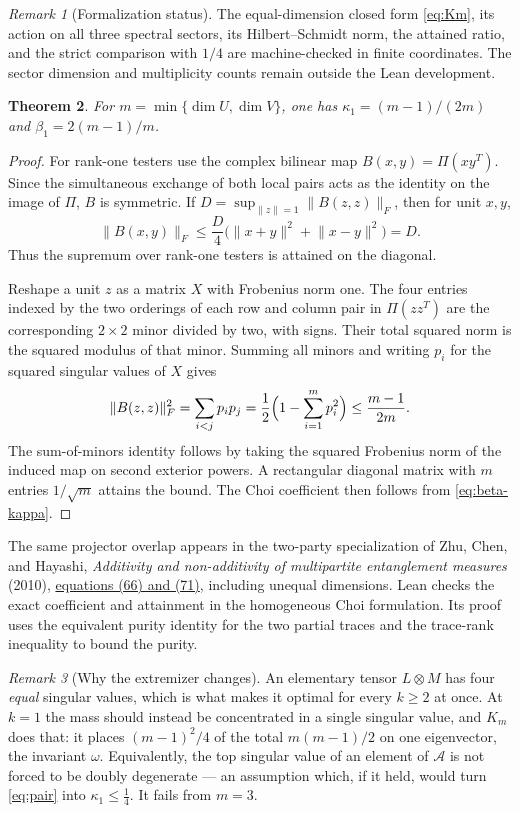 \documentclass[11pt,reqno]{amsart}
\theoremstyle{plain}
\newtheorem{theorem}{Theorem}[section]
\theoremstyle{remark}
\newtheorem{remark}[theorem]{Remark}
\newcommand{\norm}[1]{\lVert #1\rVert}
\begin{document}
\begin{remark}[Formalization status]
The equal-dimension closed form \eqref{eq:Km}, its action on all three spectral
sectors, its Hilbert--Schmidt norm, the attained ratio, and the strict
comparison with $1/4$ are machine-checked in finite coordinates. The sector
dimension and multiplicity counts remain outside the Lean development.
\end{remark}

\begin{theorem}
\label{thm:k1-exact}
For $m=\min\{\dim U,\dim V\}$, one has
$\kappa_1=(m-1)/(2m)$ and $\beta_1=2(m-1)/m$.
\end{theorem}
\begin{proof}
For rank-one testers use the complex bilinear map
$B(x,y)=\Pi(xy^T)$. Since the simultaneous exchange of both local pairs acts
as the identity on the image of $\Pi$, $B$ is symmetric. If
$D=\sup_{\norm z=1}\norm{B(z,z)}_F$, then for unit $x,y$,
\[
  \norm{B(x,y)}_F
  \le \frac{D}{4}\bigl(\norm{x+y}^2+\norm{x-y}^2\bigr)=D.
\]
Thus the supremum over rank-one testers is attained on the diagonal.

Reshape a unit $z$ as a matrix $X$ with Frobenius norm one. The four entries
indexed by the two orderings of each row and column pair in $\Pi(zz^T)$ are
the corresponding $2\times2$ minor divided by two, with signs. Their total
squared norm is the squared modulus of that minor. Summing all minors and
writing $p_i$ for the squared singular values of $X$ gives
\[
  \norm{B(z,z)}_F^2=\sum_{i<j}p_i p_j
  =\frac12\Bigl(1-\sum_{i=1}^m p_i^2\Bigr)\le\frac{m-1}{2m}.
\]
The sum-of-minors identity follows by taking the squared Frobenius norm
of the induced map on second exterior powers. A rectangular diagonal
matrix with $m$ entries $1/\sqrt m$ attains the bound. The Choi coefficient
then follows from \eqref{eq:beta-kappa}.
\end{proof}

The same projector overlap appears in the two-party specialization of
Zhu, Chen, and Hayashi, \emph{Additivity and non-additivity of multipartite
entanglement measures} (2010), \href{https://arxiv.org/abs/1002.2511}{equations
(66) and (71)}, including unequal dimensions. Lean checks the exact
coefficient and attainment in the homogeneous Choi formulation. Its proof
uses the equivalent purity identity for the two partial traces and the
trace-rank inequality to bound the purity.

\begin{remark}[Why the extremizer changes]
An elementary tensor $L\otimes M$ has four \emph{equal} singular values, which
is what makes it optimal for every $k\ge2$ at once.  At $k=1$ the mass should
instead be concentrated in a single singular value, and $K_m$ does that: it
places $(m-1)^2/4$ of the total $m(m-1)/2$ on one eigenvector, the invariant
$\omega$.  Equivalently, the top singular value of an element of $\mathcal A$ is
not forced to be doubly degenerate --- an assumption which, if it held, would
turn \cref{eq:pair} into $\kappa_1\le\frac14$.  It fails from $m=3$.
\end{remark}
\end{document}
